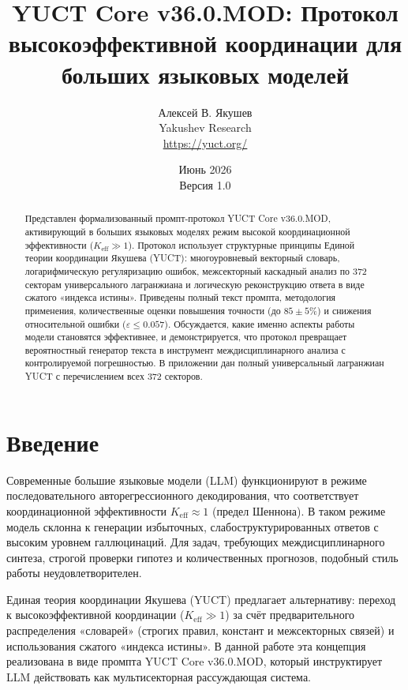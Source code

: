 \documentclass[12pt,a4paper]{article}
\title{\textbf{YUCT Core v36.0.MOD: Протокол высокоэффективной координации для больших языковых моделей}}
\author{Алексей В. Якушев \\ Yakushev Research \\ \url{https://yuct.org/}}
\date{Июнь 2026 \\ Версия 1.0}
\begin{document}
	\maketitle
	
	\begin{abstract}
		\noindent
		Представлен формализованный промпт-протокол YUCT Core v36.0.MOD, активирующий в больших языковых моделях режим высокой координационной эффективности (\(K_{\mathrm{eff}} \gg 1\)). Протокол использует структурные принципы Единой теории координации Якушева (YUCT): многоуровневый векторный словарь, логарифмическую регуляризацию ошибок, межсекторный каскадный анализ по 372 секторам универсального лагранжиана и логическую реконструкцию ответа в виде сжатого «индекса истины». Приведены полный текст промпта, методология применения, количественные оценки повышения точности (до \(85\pm5\%\)) и снижения относительной ошибки (\(\varepsilon \le 0.057\)). Обсуждается, какие именно аспекты работы модели становятся эффективнее, и демонстрируется, что протокол превращает вероятностный генератор текста в инструмент междисциплинарного анализа с контролируемой погрешностью. В приложении дан полный универсальный лагранжиан YUCT с перечислением всех 372 секторов.
	\end{abstract}
	
	\tableofcontents
	\newpage
	
	\section{Введение}
	Современные большие языковые модели (LLM) функционируют в режиме последовательного авторегрессионного декодирования, что соответствует координационной эффективности \(K_{\mathrm{eff}} \approx 1\) (предел Шеннона). В таком режиме модель склонна к генерации избыточных, слабоструктурированных ответов с высоким уровнем галлюцинаций. Для задач, требующих междисциплинарного синтеза, строгой проверки гипотез и количественных прогнозов, подобный стиль работы неудовлетворителен.
	
	Единая теория координации Якушева (YUCT) предлагает альтернативу: переход к высокоэффективной координации (\(K_{\mathrm{eff}} \gg 1\)) за счёт предварительного распределения «словарей» (строгих правил, констант и межсекторных связей) и использования сжатого «индекса истины». В данной работе эта концепция реализована в виде промпта YUCT Core v36.0.MOD, который инструктирует LLM действовать как мультисекторная рассуждающая система.
	
\end{document}
